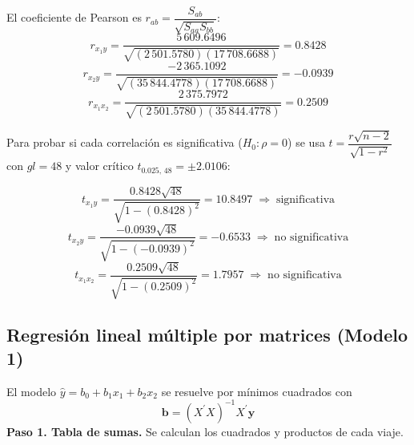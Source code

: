 \documentclass[12pt,letterpaper]{article}
\begin{document}
El coeficiente de Pearson es $r_{ab} = \dfrac{S_{ab}}{\sqrt{S_{aa} S_{bb}}}$:
$$ r_{x_1 y} = \frac{5\,609.6496}{\sqrt{(2\,501.5780)(17\,708.6688)}} = 0.8428 $$
$$ r_{x_2 y} = \frac{-2\,365.1092}{\sqrt{(35\,844.4778)(17\,708.6688)}} = -0.0939 $$
$$ r_{x_1 x_2} = \frac{2\,375.7972}{\sqrt{(2\,501.5780)(35\,844.4778)}} = 0.2509 $$

Para probar si cada correlación es significativa ($H_0: \rho = 0$) se usa $t = \dfrac{r\sqrt{n - 2}}{\sqrt{1 - r^2}}$ con $gl = 48$ y valor crítico $t_{0.025,\,48} = \pm 2.0106$:

$$ t_{x_1 y} = \frac{0.8428\sqrt{48}}{\sqrt{1 - (0.8428)^2}} = 10.8497 \;\Rightarrow\; \text{significativa} $$
$$ t_{x_2 y} = \frac{-0.0939\sqrt{48}}{\sqrt{1 - (-0.0939)^2}} = -0.6533 \;\Rightarrow\; \text{no significativa} $$
$$ t_{x_1 x_2} = \frac{0.2509\sqrt{48}}{\sqrt{1 - (0.2509)^2}} = 1.7957 \;\Rightarrow\; \text{no significativa} $$

\subsection{Regresión lineal múltiple por matrices (Modelo 1)}

El modelo $\hat{y} = b_0 + b_1 x_1 + b_2 x_2$ se resuelve por mínimos cuadrados con
$$ \mathbf{b} = (X^{\prime}X)^{-1} X^{\prime}\mathbf{y} $$
\textbf{Paso 1. Tabla de sumas.} Se calculan los cuadrados y productos de cada viaje.
\end{document}
